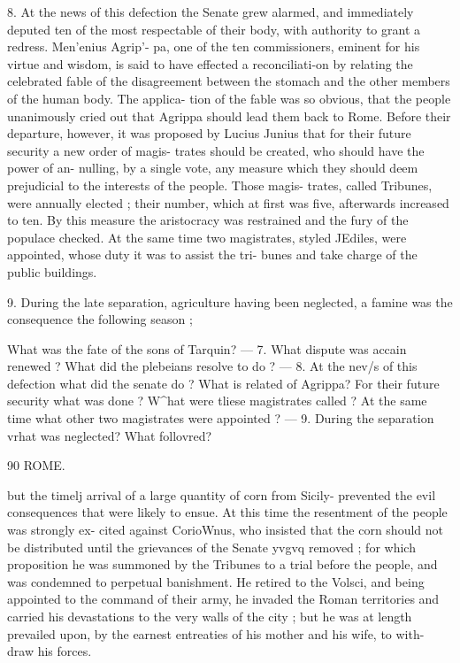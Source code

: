 \documentclass[openany,a4paper]{memoir}
\begin{document}
{8. At the news of this defection the Senate grew alarmed, 
and immediately deputed ten of the most respectable of their 
body, with authority to grant a redress. Men'enius Agrip'- 
pa, one of the ten commissioners, eminent for his virtue and 
wisdom, is said to have effected a reconciliati-on by relating 
the celebrated fable of the disagreement between the stomach 
and the other members of the human body. The applica- 
tion of the fable was so obvious, that the people unanimously 
cried out that Agrippa should lead them back to Rome. 
Before their departure, however, it was proposed by Lucius 
Junius that for their future security a new order of magis- 
trates should be created, who should have the power of an- 
nulling, by a single vote, any measure which they should 
deem prejudicial to the interests of the people. Those magis- 
trates, called Tribunes, were annually elected ; their number, 
which at first was five, afterwards increased to ten. By this 
measure the aristocracy was restrained and the fury of the 
populace checked. At the same time two magistrates, styled 
JEdiles, were appointed, whose duty it was to assist the tri- 
bunes and take charge of the public buildings. 

9. During the late separation, agriculture having been 
neglected, a famine was the consequence the following season ; 

What was the fate of the sons of Tarquin? — 7. What dispute was 
accain renewed ? What did the plebeians resolve to do ? — 8. At the nev/s 
of this defection what did the senate do ? What is related of Agrippa? 
For their future security what was done ? W^hat were tliese magistrates 
called ? At the same time what other two magistrates were appointed ? 
— 9. During the separation vrhat was neglected? What follovred? 



90 ROME. 

but the timelj arrival of a large quantity of corn from Sicily- 
prevented the evil consequences that were likely to ensue. 
At this time the resentment of the people was strongly ex- 
cited against CorioWnus, who insisted that the corn should 
not be distributed until the grievances of the Senate yvgvq 
removed ; for which proposition he was summoned by the 
Tribunes to a trial before the people, and was condemned to 
perpetual banishment. He retired to the Volsci, and being 
appointed to the command of their army, he invaded the 
Roman territories and carried his devastations to the very 
walls of the city ; but he was at length prevailed upon, by 
the earnest entreaties of his mother and his wife, to with- 
draw his forces. 

}
\end{document}
